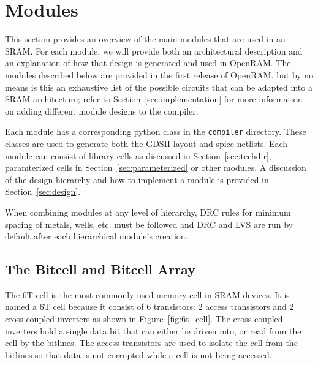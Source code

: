 \section{Modules}
\label{sec:modules}

This section provides an overview of the main modules that are used in
an SRAM.  For each module, we will provide both an architectural
description and an explanation of how that design is generated and
used in OpenRAM.  The modules described below are provided in the
first release of OpenRAM, but by no means is this an exhaustive list
of the possible circuits that can be adapted into a SRAM architecture;
refer to Section~\ref{sec:implementation} for more information on
adding different module designs to the compiler.

Each module has a corresponding python class in the \verb|compiler|
directory.  These classes are used to generate both the GDSII layout
and spice netlists. Each module can consist of library cells as
discussed in Section~\ref{sec:techdir}, paramterized cells in
Section~\ref{sec:parameterized} or other modules.  A discussion of the
design hierarchy and how to implement a module is provided in
Section~\ref{sec:design}.

When combining modules at any level of hierarchy, DRC rules for
minimum spacing of metals, wells, etc. must be followed and DRC and
LVS are run by default after each hierarchical module's creation.


\subsection{The Bitcell and Bitcell Array}
\label{sec:bitcellarray}

The 6T cell is the most commonly used memory cell in SRAM devices.  It
is named a 6T cell because it consist of 6 transistors: 2 access
transistors and 2 cross coupled inverters as shown in
Figure~\ref{fig:6t_cell}.  The cross coupled inverters hold a single
data bit that can either be driven into, or read from the cell by the
bitlines.  The access transistors are used to isolate the cell from
the bitlines so that data is not corrupted while a cell is not being
accessed.

